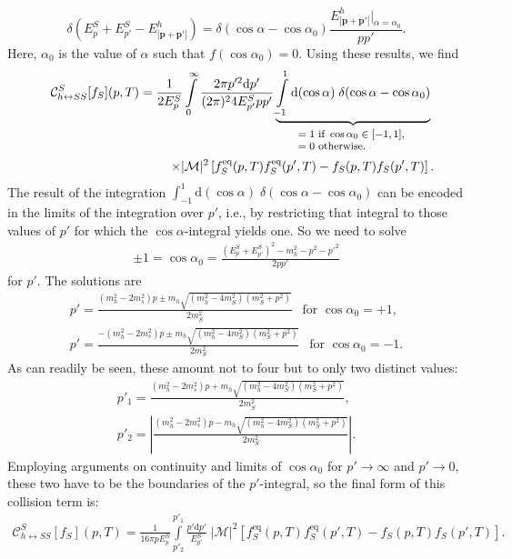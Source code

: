 \begin{equation}
\delta(E^S_p+E^S_{p'} - E^h_{|\mathbf{p}+\mathbf{p'}|}) =\delta(\cos\alpha-\cos\alpha_0)\frac{E^h_{|\mathbf{p}+\mathbf{p'}|}|_{\alpha=\alpha_0}}{pp'}.
\end{equation}
Here, $\alpha_0$ is the value of $\alpha$ such that $f(\cos\alpha_0)=0$. Using these results, we find
\begin{eqnarray}
&& \mathcal{C}^S_{h\leftrightarrow SS} [f_S](p,T) = \frac{1}{2 E^S_p} \int \limits_0^\infty \frac{2 \pi p'^2\mathrm{d}p'}{(2 \pi)^2 4 E^S_{p'} pp'} \underbrace{\int \limits_{-1}^1 \mathrm{d}(\cos\alpha)\; \delta (\cos\alpha-\cos\alpha_0)}_{
\footnotesize
\begin{matrix}
=1\text{ if }\cos\alpha_0\in [-1,1]\text{, }\\
=0 \text{ otherwise.}\hfill \hfill \hfill
\end{matrix}
} \;\nonumber\\
&&\times |\mathcal{M}|^2 \left[ f^\text{eq}_S(p,T)f^\text{eq}_S(p',T) - f_S(p,T) f_S(p',T) \right].
\end{eqnarray}
The result of the integration $\int_{-1}^1 \mathrm{d}(\cos\alpha) \;\delta (\cos\alpha-\cos\alpha_0)$ can be encoded in the limits of the integration over $p'$, i.e., by restricting that integral to those values of $p'$ for which the $\cos\alpha$-integral yields one. So we need to solve
\begin{align}
\pm 1= \cos\alpha_0 =\frac{\left( E^S_p + E^S_{p'} \right)^2 - m_h^2 - p^2 -p'^2 }{2 p p'}
\end{align}
for $p'$. The solutions are
\begin{align}
p' = \frac{(m_h^2-2m_s^2) p \pm m_h \sqrt{(m_h^2 - 4 m_S^2) ( m_S^2 + p^2 )}}{2 m_S^2}\ \ \text{ for }\cos\alpha_0 = +1,\\
p' = \frac{-(m_h^2-2m_s^2) p \pm m_h \sqrt{(m_h^2 - 4 m_S^2) ( m_S^2 + p^2 )}}{2 m_S^2}\ \ \text{ for }\cos\alpha_0 = -1.
\end{align}
As can readily be seen, these amount not to four but to only two distinct values:
\begin{align}
p' _1= \frac{(m_h^2-2m_s^2) p + m_h \sqrt{(m_h^2 - 4 m_S^2) ( m_S^2 + p^2 )}}{2 m_S^2},\\
p' _2= \left|\frac{(m_h^2-2m_s^2) p - m_h \sqrt{(m_h^2 - 4 m_S^2) ( m_S^2 + p^2 )}}{2 m_S^2}\right|.
\end{align}
Employing arguments on continuity and limits of $\cos\alpha_0$ for $p'\rightarrow \infty$ and $p'\rightarrow 0$, these two have to be the boundaries of the $p'$-integral, so the final form of this collision term is:
\begin{align}
\mathcal{C}^S_{h\leftrightarrow SS} [f_S](p,T) = \frac{1}{16 \pi p E^S_p} \int \limits_{p'_2}^{p'_1} \frac{p' \mathrm{d}p'}{ E^S_{p'} }  \; |\mathcal{M}|^2 \left[ f^\text{eq}_S(p,T)f^\text{eq}_S(p',T) - f_S(p,T) f_S(p',T)  \right].
\end{align}

